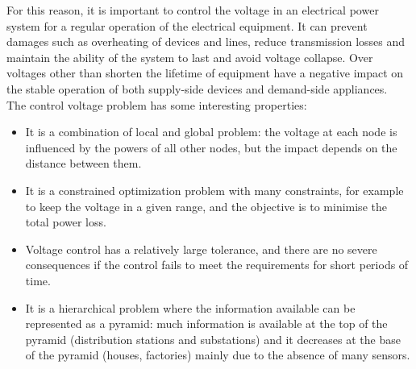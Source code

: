 For this reason, it is important to control the voltage in an electrical power system for a regular operation of the electrical equipment. It can prevent damages such as overheating of devices and lines, reduce transmission losses and maintain the ability of the system to last and avoid voltage collapse. Over voltages other than shorten the lifetime of equipment have a negative impact on the stable operation of both supply-side devices and demand-side appliances. \\


\noindent The control voltage problem has some interesting properties:
\begin{itemize}
    \item It is a combination of local and global problem: the voltage at each node is influenced by the powers of all other nodes, but the impact depends on the distance between them.
    
    \item It is a constrained optimization problem with many constraints, for example to keep the voltage in a given range, and the objective is to minimise the total power loss.
    
    \item Voltage control has a relatively large tolerance, and there are no severe consequences if the control fails to meet the requirements for short periods of time. \cite{wang2022multiagent}
    
    \item It is a hierarchical problem where the information available can be represented as a pyramid: much information is available at the top of the pyramid (distribution stations and substations) and it decreases at the base of the pyramid (houses, factories) mainly due to the absence of many sensors.
\end{itemize}


